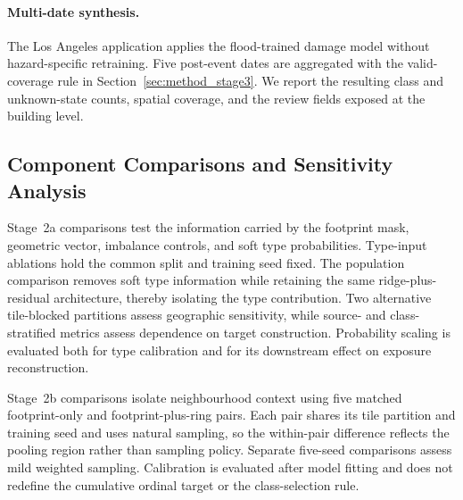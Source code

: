 
\paragraph{Multi-date synthesis.}
The Los Angeles application applies the flood-trained damage model without hazard-specific retraining. Five post-event dates are aggregated with the valid-coverage rule in Section~\ref{sec:method_stage3}. We report the resulting class and unknown-state counts, spatial coverage, and the review fields exposed at the building level.


\subsection{Component Comparisons and Sensitivity Analysis}
\label{sec:exp_comparisons}

Stage~2a comparisons test the information carried by the footprint mask, geometric vector, imbalance controls, and soft type probabilities. Type-input ablations hold the common split and training seed fixed. The population comparison removes soft type information while retaining the same ridge-plus-residual architecture, thereby isolating the type contribution. Two alternative tile-blocked partitions assess geographic sensitivity, while source- and class-stratified metrics assess dependence on target construction. Probability scaling is evaluated both for type calibration and for its downstream effect on exposure reconstruction.

Stage~2b comparisons isolate neighbourhood context using five matched footprint-only and footprint-plus-ring pairs. Each pair shares its tile partition and training seed and uses natural sampling, so the within-pair difference reflects the pooling region rather than sampling policy. Separate five-seed comparisons assess mild weighted sampling. Calibration is evaluated after model fitting and does not redefine the cumulative ordinal target or the class-selection rule.


